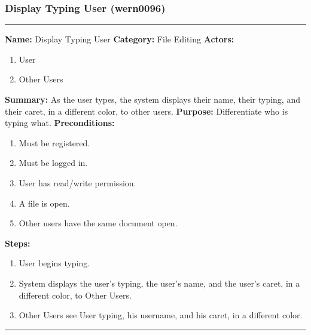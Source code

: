 \documentclass[11pt]{report}
\begin{document}
\subsubsection{Display Typing User (wern0096)}
\vspace{2pt}
\hrule
\vspace{8pt}
	\noindent\textbf{Name:} Display Typing User \newline
	\textbf{Category:} File Editing \newline
	\textbf{Actors:}
	\begin{enumerate}
		\item User
		\item Other Users
	\end{enumerate}
	\textbf{Summary:} As the user types, the system displays their name, their typing, and their caret, in a different color, to other users. \newline
	\textbf{Purpose:} Differentiate who is typing what. \newline
	\textbf{Preconditions:}
	\begin{enumerate}
		\item Must be registered.
		\item Must be logged in.
		\item User has read/write permission.
		\item A file is open.
		\item Other users have the same document open.
	\end{enumerate}
	\textbf{Steps:}
	\begin{enumerate}
		\item User begins typing.
		\item System displays the user's typing, the user's name, and the user's caret, in a different color, to Other Users.
		\item Other Users see User typing, his username, and his caret, in a different color.
	\end{enumerate}
\vspace{8pt}
\hrule
\newpage
\end{document}
